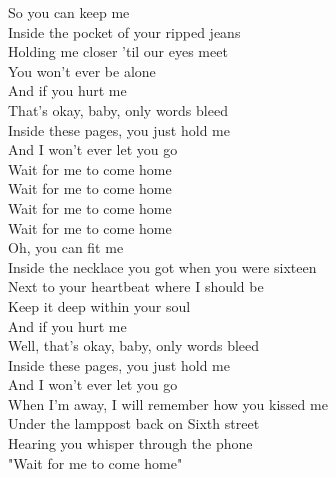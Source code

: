 \documentclass{novel}
\begin{document}
\begin{multicols}{2}
So you can keep me \\
Inside the pocket of your ripped jeans \\
Holding me closer 'til our eyes meet \\
You won't ever be alone \\

And if you hurt me \\
That's okay, baby, only words bleed \\
Inside these pages, you just hold me \\
And I won't ever let you go \\

Wait for me to come home \\
Wait for me to come home \\
Wait for me to come home \\
Wait for me to come home \\

Oh, you can fit me \\
Inside the necklace you got when you were sixteen \\
Next to your heartbeat where I should be \\
Keep it deep within your soul \\

And if you hurt me \\
Well, that's okay, baby, only words bleed \\
Inside these pages, you just hold me \\
And I won't ever let you go \\

When I'm away, I will remember how you kissed me \\
Under the lamppost back on Sixth street \\
Hearing you whisper through the phone \\
"Wait for me to come home"
\end{multicols}
\end{document}
